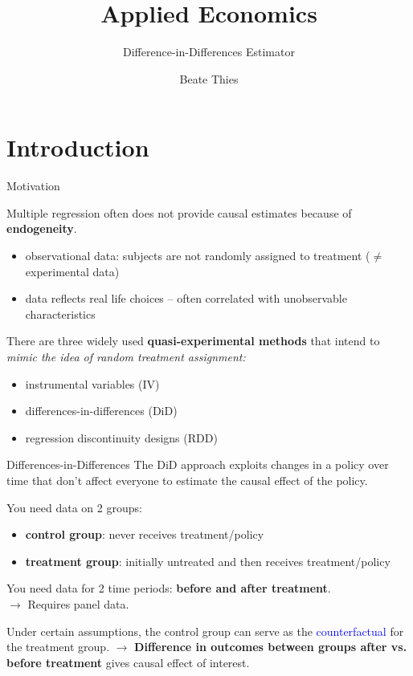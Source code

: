 \documentclass[11pt, aspectratio = 169]{beamer}
\title{Applied Economics}
\subtitle{Difference-in-Differences Estimator}
\author{Beate Thies}
\date{}
\institute{Winter 2024/25}
\begin{document}
\maketitle

\section{Introduction}

\begin{frame}{Motivation}
    
Multiple regression often does not provide causal estimates because of \color{teal}\textbf{endogeneity}. \color{black}
\begin{itemize}
    \item observational data: subjects are not randomly assigned to treatment ($\neq$ experimental data)
    \item data reflects real life choices -- often correlated with unobservable characteristics
\end{itemize}

\pause 


There are three widely used \color{teal}\textbf{quasi-experimental methods} \color{black}that intend to \textit{mimic the idea of random treatment assignment:} 
\begin{itemize}
    \item instrumental variables (IV)
    \item differences-in-differences (DiD)
    \item regression discontinuity designs (RDD)
\end{itemize}

\end{frame}

\begin{frame}{Differences-in-Differences}
The DiD approach exploits changes in a policy over time that don't affect everyone to estimate the causal effect of the policy.

\pause 

You need data on 2 groups:
\begin{itemize}
    \item \textbf{control group}: never receives treatment/policy
    \item \textbf{treatment group}: initially untreated and then receives treatment/policy
\end{itemize}

\pause 
You need data for 2 time periods:   \textbf{before and after treatment}. \\
$\rightarrow$ Requires panel data.


Under certain assumptions, the control group can serve as the \textcolor{blue}{counterfactual} for the treatment group. $\rightarrow$ \textbf{Difference in outcomes between groups after vs. before treatment} gives causal effect of interest.
\end{frame}
\end{document}
